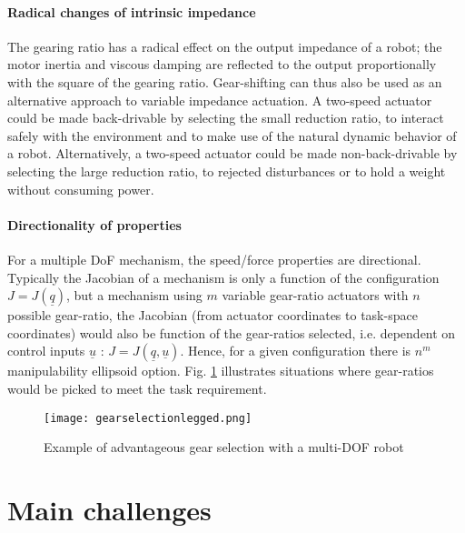 \paragraph{Radical changes of intrinsic impedance}
The gearing ratio has a radical effect on the output impedance of a robot; the motor inertia and viscous damping are reflected to the output proportionally with the square of the gearing ratio. Gear-shifting can thus also be used as an alternative approach to variable impedance actuation. A two-speed actuator could be made back-drivable by selecting the small reduction ratio, to interact safely with the environment and to make use of the natural dynamic behavior of a robot.  Alternatively, a two-speed actuator could be made non-back-drivable by selecting the large reduction ratio, to rejected disturbances or to hold a weight without consuming power.

\paragraph{Directionality of properties}
For a multiple DoF mechanism, the speed/force properties are directional. Typically the Jacobian of a mechanism is only a function of the configuration $J=J(\underline{q})$, but a mechanism using $m$ variable gear-ratio actuators with $n$ possible gear-ratio, the Jacobian (from actuator coordinates to task-space coordinates) would also be function of the gear-ratios selected, i.e. dependent on control inputs $\underline{u}$ : $J=J(\underline{q},\underline{u})$. Hence, for a given configuration there is $n^m$ manipulability ellipsoid option. Fig. \ref{fig:gearselectionlegged} illustrates situations where gear-ratios would be picked to meet the task requirement.


\begin{figure}[H]
	\centering
		\texttt{[image: gearselectionlegged.png]}
	\caption{Example of advantageous gear selection with a multi-DOF robot}
	\label{fig:gearselectionlegged}
\end{figure}


\section{Main challenges}
\label{sec:MainChallenges}

